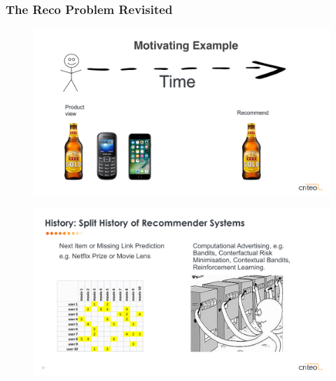  \begin{frame}
  \frametitle{The Reco Problem Revisited}
 
 
   \begin{figure}[h!]
     \includegraphics[scale=0.3]{images/mot_ex5.png}
       \centering
       \label{motex1}
   \end{figure}
     
 \end{frame}

 \begin{frame}
  
   \begin{figure}[h!]
     \includegraphics[scale=0.34]{images/octo.png}
       \centering
       \label{motex1}
   \end{figure}
     
 \end{frame}


